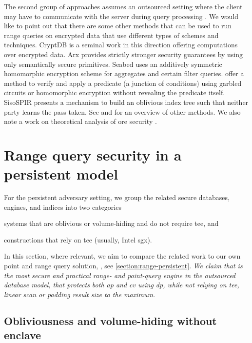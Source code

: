 		The second group of approaches assumes an outsourced setting where the client may have to communicate with the server during query processing \cite{pope, florian-protocol, secure-queries-overview, practical-range-search}.
		We would like to point out that there are some other methods that can be used to run range queries on encrypted data that use different types of schemes and techniques.
		CryptDB \cite{crypt-db} is a seminal work in this direction offering computations over encrypted data.
		Arx \cite{arx} provides strictly stronger security guarantees by using only semantically secure primitives.
		Seabed \cite{seabed} uses an additively symmetric homomorphic encryption scheme for aggregates and certain filter queries.
		\textcite{ppqed} offer a method to verify and apply a predicate (a junction of conditions) using garbled circuits or homomorphic encryption without revealing the predicate itself.
		SisoSPIR \cite{sisospir} presents a mechanism to build an oblivious index tree such that neither party learns the pass taken.
		See \cite{secure-queries-overview} and \cite{protocols-survey} for an overview of other methods. %
		We also note a work on theoretical analysis of \acrshort{ore} security \cite{ore-theory-security}.

	\section{Range query security in a persistent model}

		For the persistent adversary setting, we group the related secure databases, engines, and indices into two categories
		\begin{enumerate*}[label={(\roman*)}]
			\item systems that are oblivious or volume-hiding and do not require \acrfull{tee}, and
			\item constructions that rely on \acrshort{tee} (usually, Intel \acrshort{sgx}).
		\end{enumerate*}
		In this section, where relevant, we aim to compare the related work to our own point and range query solution, \epsolute{} \cite{epsolute}, see \cref{section:range-persistent}.
		\emph{We claim that \epsolute{} is the most secure and practical range- and point-query engine in the outsourced database model, that protects both \acrfull{ap} and \acrfull{cv} using \acrlong{dp}, while not relying on \acrshort{tee}, linear scan or padding result size to the maximum.}

		\subsection{Obliviousness and volume-hiding without enclave}

